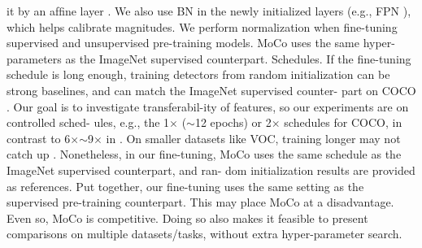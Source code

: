 \documentclass[10pt,twocolumn]{article}  %
\begin{document}
it by an afﬁne layer \cite{33_he2016deep}. We also use BN in the newly initialized
layers (e.g., FPN \cite{41_lin2017feature}), which helps calibrate magnitudes.
We perform normalization when ﬁne-tuning supervised
and unsupervised pre-training models. MoCo uses the same
hyper-parameters as the ImageNet supervised counterpart.
Schedules. If the ﬁne-tuning schedule is long enough,
training detectors from random initialization can be strong
baselines, and can match the ImageNet supervised counter-
part on COCO \cite{31_he2019rethinking}. Our goal is to investigate transferabil-ity
of features, so our experiments are on controlled sched-
ules, e.g., the 1$\times $ ($\sim $12 epochs) or 2$\times $ schedules \cite{22_girshick2018detectron} for
COCO, in contrast to 6$\times $$\sim $9$\times $ in \cite{31_he2019rethinking}. On smaller datasets
like VOC, training longer may not catch up \cite{31_he2019rethinking}.
Nonetheless, in our ﬁne-tuning, MoCo uses the same
schedule as the ImageNet supervised counterpart, and ran-
dom initialization results are provided as references.
Put together, our ﬁne-tuning uses the same setting as the
supervised pre-training counterpart. This may place MoCo
at a disadvantage. Even so, MoCo is competitive. Doing so
also makes it feasible to present comparisons on multiple
datasets/tasks, without extra hyper-parameter search.
\end{document}
